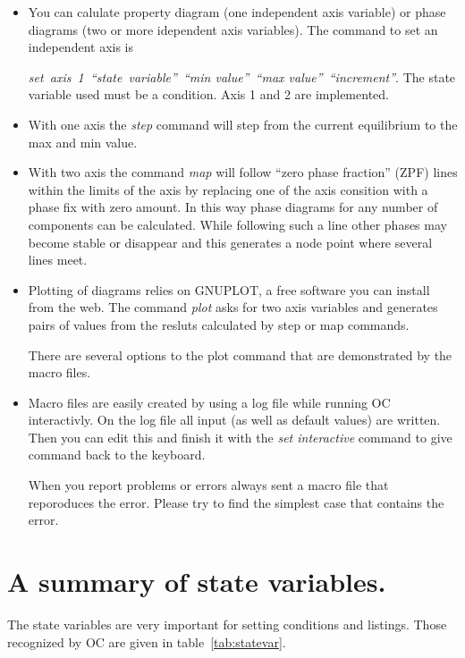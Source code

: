 \documentclass[12pt]{article}
\begin{document}
\begin{itemize}
\item You can calulate property diagram (one independent axis
  variable) or phase diagrams (two or more idependent axis variables).
  The command to set an independent axis is 

  {\em set~axis~1~``state~variable''~``min value''~``max
    value''~``increment''}.  The state variable used must be a
  condition.  Axis 1 and 2 are implemented.

\item With one axis the {\em step} command will step from the current
  equilibrium to the max and min value.

\item With two axis the command {\em map} will follow ``zero phase
  fraction'' (ZPF) lines within the limits of the axis by replacing
  one of the axis consition with a phase fix with zero amount.  In
  this way phase diagrams for any number of components can be
  calculated.  While following such a line other phases may become
  stable or disappear and this generates a node point where several
  lines meet.

\item Plotting of diagrams relies on GNUPLOT, a free software you can
  install from the web.  The command {\em plot} asks for two axis
  variables and generates pairs of values from the resluts calculated
  by step or map commands.

  There are several options to the plot command that are demonstrated by
  the macro files.

\item Macro files are easily created by using a log file while running
  OC interactivly.  On the log file all input (as well as default
  values) are written.  Then you can edit this and finish it with the
  {\em set interactive} command to give command back to the keyboard.

  When you report problems or errors always sent a macro file that
  reporoduces the error.  Please try to find the simplest case that
  contains the error.
\end{itemize}

\section{A summary of state variables.}

The state variables are very important for setting conditions and
listings.  Those recognized by OC are given in
table~\ref{tab:statevar}.
\end{document}
